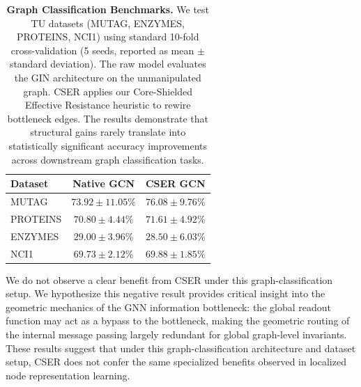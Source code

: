 \documentclass[10pt]{article} %
\begin{document}
\begin{table}[h]
    \centering
    \caption{\textbf{Graph Classification Benchmarks.} We test TU datasets (MUTAG, ENZYMES, PROTEINS, NCI1) using standard 10-fold cross-validation (5 seeds, reported as mean $\pm$ standard deviation). The raw model evaluates the GIN architecture on the unmanipulated graph. CSER applies our Core-Shielded Effective Resistance heuristic to rewire bottleneck edges. The results demonstrate that structural gains rarely translate into statistically significant accuracy improvements across downstream graph classification tasks.}
    \label{tab:graph_class}
    \begin{tabular}{lcc}
    \toprule
    \textbf{Dataset} & \textbf{Native GCN} & \textbf{CSER GCN} \\
    \midrule
    MUTAG & $73.92 \pm 11.05\%$ & $76.08 \pm 9.76\%$ \\
    PROTEINS & $70.80 \pm 4.44\%$ & $71.61 \pm 4.92\%$ \\
    ENZYMES & $29.00 \pm 3.96\%$ & $28.50 \pm 6.03\%$ \\
    NCI1 & $69.73 \pm 2.12\%$ & $69.88 \pm 1.85\%$ \\
    \bottomrule
    \end{tabular}
\end{table}

We do not observe a clear benefit from CSER under this graph-classification setup. We hypothesize this negative result provides critical insight into the geometric mechanics of the GNN information bottleneck: the global readout function may act as a bypass to the bottleneck, making the geometric routing of the internal message passing largely redundant for global graph-level invariants. These results suggest that under this graph-classification architecture and dataset setup, CSER does not confer the same specialized benefits observed in localized node representation learning.
\end{document}
